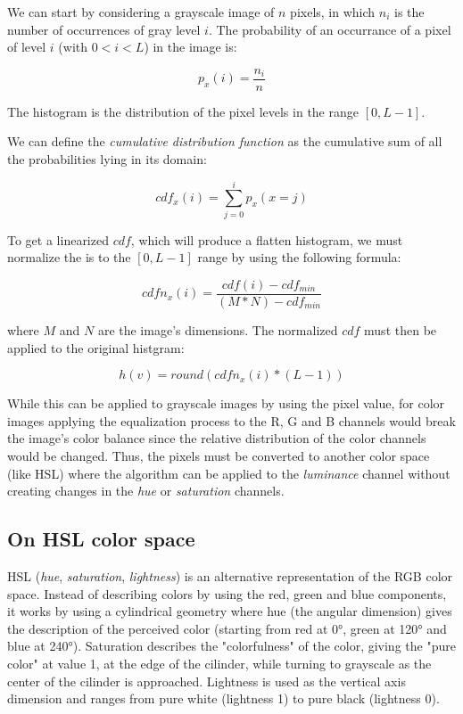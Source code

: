 \documentclass[10pt,twocolumn,letterpaper]{article}
\begin{document}
We can start by considering a grayscale image of \(n\) pixels, in which \(n_i\)
is the number of occurrences of gray level \(i\). The probability of an occurrance
of a pixel of level \(i\) (with \(0 < i < L\)) in the image is:

\[ p_x(i) = \frac{n_i}{n} \]

The histogram is the distribution of the pixel levels in the range \([0, L - 1]\).

We can define the \emph{cumulative distribution function} as the cumulative sum
of all the probabilities lying in its domain:

\[ cdf_x(i) = \sum_{j=0}^{i} p_x(x = j) \]

To get a linearized \(cdf\), which will produce a flatten histogram, we must
normalize the is to the \([0, L - 1]\) range by using the following formula:

\[ cdfn_x(i) = \frac{cdf(i) - cdf_{min}}{(M * N) - cdf_{min}} \]

where \(M\) and \(N\) are the image's dimensions. The normalized \(cdf\) must
then be applied to the original histgram:

\[ h(v) = round(cdfn_x(i) * (L - 1)) \]

While this can be applied to grayscale images by using the pixel value, for
color images applying the equalization process to the R, G and B channels would
break the image's color balance since the relative distribution of the color
channels would be changed. Thus, the pixels must be converted to another color
space (like HSL) where the algorithm can be applied to the \emph{luminance}
channel without creating changes in the \emph{hue} or \emph{saturation}
channels.

\subsection{On HSL color space}

HSL (\emph{hue}, \emph{saturation}, \emph{lightness}) is an alternative
representation of the RGB color space. Instead of describing colors by
using the red, green and blue components, it works by using a cylindrical
geometry where hue (the angular dimension) gives the description of the
perceived color (starting from red at 0°, green at 120° and blue at 240°).
Saturation describes the "colorfulness" of the color, giving the "pure color"
at value 1, at the edge of the cilinder, while turning to grayscale as the center
of the cilinder is approached. Lightness is used as the vertical axis dimension
and ranges from pure white (lightness 1) to pure black (lightness 0).
\end{document}
